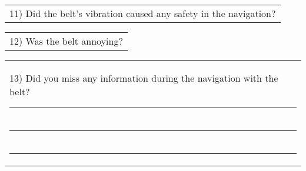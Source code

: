 \begin{table}[!thb]
        
        

    \begin{tabular}{m{1\linewidth}}
        \vspace{2ex}
        11)	Did the belt's vibration caused any safety in the navigation?
    \end{tabular}

        
        

    \begin{tabular}{m{1\linewidth}}
        \vspace{2ex}
        12)	Was the belt annoying?
    \end{tabular}

        
        

    \begin{tabular}{m{1\linewidth}}
        \vspace{2ex}
        13)	Did you miss any information during the navigation with the belt?

        \noindent
        \rule{6in}{.2mm} \\
        \rule{6in}{.2mm} \\
        \rule{6in}{.2mm}

    \end{tabular}
\end{table}

\FloatBarrier

